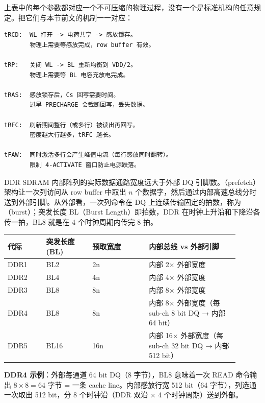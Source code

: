 

上表中的每个参数都对应一个不可压缩的物理过程，没有一个是标准机构的任意规定。把它们与本节前文的机制一一对应：

\begin{lstlisting}[numbers=none,caption={为什么需要这些等待}]
tRCD:  WL 打开 -> 电荷共享 -> 感放锁存。
       物理上需要等感放完成，row buffer 有效。

tRP:   关闭 WL -> BL 重新均衡到 VDD/2。
       物理上需要等 BL 电容充放电完成。

tRAS:  感放锁存后，Cs 回写需要时间。
       过早 PRECHARGE 会截断回写，丢失数据。

tRFC:  刷新期间整行（或多行）被读出再回写。
       密度越大行越多，tRFC 越长。

tFAW:  同时激活多行会产生峰值电流（每行感放同时翻转）。
       限制 4-ACTIVATE 窗口防止电源跌落。
\end{lstlisting}


DDR SDRAM 内部阵列的实际数据通路宽度远大于外部 DQ 引脚数。（prefetch）架构让一次列访问从 row buffer 中取出 $n$ 个数据字，然后通过内部高速总线分时送到外部引脚。从外部看，一次列命令在 DQ 上连续传输固定的拍数，称为（burst）；突发长度 BL（Burst Length）即拍数，DDR 在时钟上升沿和下降沿各传一拍，BL8 就是在 4 个时钟周期内传完 8 拍。

\begin{longtable}{L{0.15\linewidth}L{0.18\linewidth}L{0.22\linewidth}L{0.35\linewidth}}
\toprule
代际 & 突发长度 (BL) & 预取宽度 & 内部总线 vs 外部引脚 \\
\midrule
DDR1 & BL2 & 2n & 内部 2$\times$ 外部宽度 \\
DDR2 & BL4 & 4n & 内部 4$\times$ 外部宽度 \\
DDR3 & BL8 & 8n & 内部 8$\times$ 外部宽度 \\
DDR4 & BL8 & 8n & 内部 8$\times$ 外部宽度（每 sub-ch 8 bit DQ → 内部 64 bit） \\
DDR5 & BL16 & 16n & 内部 16$\times$ 外部宽度（每 sub-ch 32 bit DQ → 内部 512 bit） \\
\bottomrule
\end{longtable}

\textbf{DDR4 示例}：外部每通道 64 bit DQ（8 字节），BL8 意味着一次 READ 命令输出 $8 \times 8 = 64$ 字节 = 一条 cache line。内部感放行宽 512 bit（64 字节），列选通一次取出 512 bit，分 8 个时钟沿（DDR 双沿 × 4 个时钟周期）送到外部。

